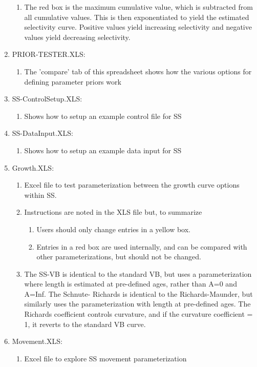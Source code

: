\begin{enumerate}
\begin{enumerate}
			\item The red box is the maximum cumulative value, which is subtracted from all cumulative values.  This is then exponentiated to yield the estimated selectivity curve.  Positive values yield increasing selectivity and negative values yield decreasing selectivity.
		\end{enumerate}
		\item PRIOR-TESTER.XLS:
		\begin{enumerate}
			\item The 'compare' tab of this spreadsheet shows how the various options for defining parameter priors work
		\end{enumerate}
		\item SS-Control\textunderscore Setup.XLS:
		\begin{enumerate}
			\item Shows how to setup an example control file for SS
		\end{enumerate}
		\item SS-Data\textunderscore Input.XLS:
		\begin{enumerate}
			\item Shows how to setup an example data input for SS
		\end{enumerate}
		\item Growth.XLS: 
		\begin{enumerate}
			\item Excel file to test parameterization between the growth curve options within SS.
			\item Instructions are noted in the XLS file but, to summarize
			\begin{enumerate}
				\item Users should only change entries in a yellow box.  
				\item Entries in a red box are used internally, and can be compared with other parameterizations, but should not be changed.
			\end{enumerate}
			\item The SS-VB is identical to the standard VB, but uses a parameterization where length is estimated at pre-defined ages, rather than A=0 and A=Inf.  The Schnute- Richards is identical to the Richards-Maunder, but similarly uses the parameterization with length at pre-defined ages.  The Richards coefficient controls curvature, and if the curvature coefficient = 1, it reverts to the standard VB curve. 
		\end{enumerate}
		\item Movement.XLS:
		\begin{enumerate}
			\item Excel file to explore SS movement parameterization
		\end{enumerate}
	\end{enumerate}
		

